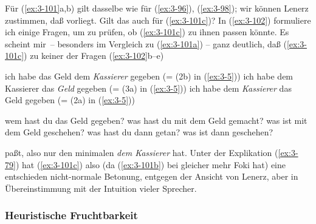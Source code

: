 \documentclass[output=paper]{langsci/langscibook}
\begin{document}
Für (\ref{ex:3-101}a,b) gilt dasselbe wie für (\ref{ex:3-96}), (\ref{ex:3-98}); wir können Lenerz
zustimmen, daß  vorliegt. Gilt das auch für (\ref{ex:3-101c})? In
(\ref{ex:3-102}) formuliere ich einige Fragen, um zu prüfen, ob (\ref{ex:3-101c}) zu ihnen
passen könnte. Es scheint mir~-- besonders im Vergleich zu (\ref{ex:3-101a}) --
ganz deutlich, daß (\ref{ex:3-101c}) zu keiner der Fragen (\ref{ex:3-102}b--e)
\begin{exe}
\ex
\label{ex:3-101}
\begin{xlist}
\ex
\label{ex:3-101a}
ich habe das Geld dem \textit{Kassierer} gegeben (= (2b) in (\ref{ex:3-5}))
\ex
\label{ex:3-101b}
ich habe dem Kassierer das \textit{Geld} gegeben (= (3a) in (\ref{ex:3-5}))
\ex
\label{ex:3-101c}
ich habe dem \textit{Kassierer} das Geld gegeben (= (2a) in (\ref{ex:3-5}))
\end{xlist}
\ex
\label{ex:3-102}
\begin{xlist}
\ex
\label{ex:3-102a}
wem hast du das Geld gegeben?
\ex
\label{ex:3-102b}
was hast du mit dem Geld gemacht?
\ex
\label{ex:3-102c}
was ist mit dem Geld geschehen?
\ex
\label{ex:3-102d}
was hast du dann getan?
\ex
\label{ex:3-102e}
was ist dann geschehen?
\end{xlist}
\end{exe}
paßt, also nur den minimalen  \textit{dem Kassierer} hat. Unter der
Explikation (\ref{ex:3-79}) hat (\ref{ex:3-101c}) also (da (\ref{ex:3-101b}) bei gleicher
 mehr Foki hat) eine entschieden nicht-normale Betonung,
entgegen der Ansicht von Lenerz, aber in Übereinstimmung mit der
Intuition vieler Sprecher.

\subsubsection{Heuristische Fruchtbarkeit}
\label{subsubsec:3-1-4-3}
\end{document}
